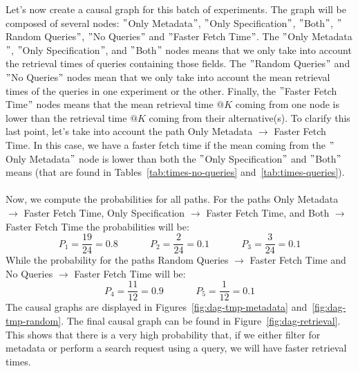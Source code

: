 \noindent Let's now create a causal graph for this batch of experiments.
The graph will be composed of several nodes: \("\)Only Metadata\("\), \("\)Only Specification\("\), \("\)Both\("\), \("\)Random Queries\("\), \("\)No Queries\("\) and \("\)Faster Fetch Time\("\).
The \("\)Only Metadata\("\), \("\)Only Specification\("\), and \("\)Both\("\) nodes means that we only take into account the retrieval times of queries containing those fields.
The \("\)Random Queries\("\) and \("\)No Queries\("\) nodes mean that we only take into account the mean retrieval times of the queries in one experiment or the other.
Finally, the \("\)Faster Fetch Time\("\) nodes means that the mean retrieval time $@K$ coming from one node is lower than the retrieval time $@K$ coming from their alternative(s).
To clarify this last point, let's take into account the path Only Metadata $\rightarrow$ Faster Fetch Time.
In this case, we have a faster fetch time if the mean coming from the \("\)Only Metadata\("\) node is lower than both the \("\)Only Specification\("\) and \("\)Both\("\) means (that are found in Tables~\ref{tab:times-no-queries} and~\ref{tab:times-queries}). \\ \\
Now, we compute the probabilities for all paths.
For the paths Only Metadata $\rightarrow$ Faster Fetch Time, Only Specification $\rightarrow$ Faster Fetch Time, and Both $\rightarrow$ Faster Fetch Time the probabilities will be:
\[P_1 = \frac{19}{24} = 0.8~~~~~~~~~~~~~~~P_2 = \frac{2}{24} = 0.1~~~~~~~~~~~~~~~P_3 = \frac{3}{24} = 0.1\]
While the probability for the paths Random Queries $\rightarrow$ Faster Fetch Time and No Queries $\rightarrow$ Faster Fetch Time will be:
\[P_4 = \frac{11}{12} = 0.9~~~~~~~~~~~~~~~P_5 = \frac{1}{12} = 0.1\]
The causal graphs are displayed in Figures~\ref{fig:dag-tmp-metadata} and~\ref{fig:dag-tmp-random}.
The final causal graph can be found in Figure~\ref{fig:dag-retrieval}.
This shows that there is a very high probability that, if we either filter for metadata or perform a search request using a query, we will have faster retrieval times.

